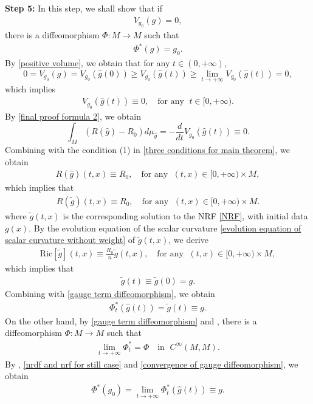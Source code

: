 \documentclass[12pt]{amsart}
\begin{document}
\textbf{Step 5: } In this step, we shall show that if
\begin{align*}
    V_{g_0}(g) = 0,
\end{align*}
there is a diffeomorphism $\Phi: M \rightarrow M$ such that 
\begin{align*}
    \Phi^*(g) = g_0. 
\end{align*}
By \eqref{positive volume}, we obtain that for any $t\in (0, +\infty)$, 
\begin{equation*}
    0 = V_{g_0}(g) = V_{g_0}(\hat{g}(0)) \geq V_{g_0}(\hat{g}(t)) \geq \lim_{t\rightarrow +\infty} V_{g_0}(\hat{g}(t)) = 0,
\end{equation*}
which implies 
\begin{align*}
    V_{g_0}(\hat{g}(t)) \equiv 0,\quad \text{for any }\; t\in [0, +\infty).  
\end{align*}
By \eqref{final proof formula 2}, we obtain  
\begin{equation*}
    \int_{M} (R(\hat{g}) - R_0) d\mu_{\hat{g}} = -\frac{d}{dt}V_{g_0}(\hat{g}(t)) \equiv 0.
\end{equation*}
Combining with the condition (1) in \eqref{three conditions for main theorem}, we obtain 
\begin{align*}
    R(\hat{g})(t, x) \equiv R_0,\quad \text{for any }\; (t, x)\in [0, +\infty) \times M,  
\end{align*}
which implies that 
\begin{align*}
    R(\tilde{g})(t, x) \equiv R_0,\quad \text{for any }\; (t, x)\in [0, +\infty) \times M. 
\end{align*}
where $\tilde{g}(t, x)$ is the corresponding solution to the NRF \eqref{NRF}, with initial data $g(x)$. By the evolution equation of the scalar curvature \eqref{evolution equation of scalar curvature without weight} of $\tilde{g}(t, x)$, we derive 
\begin{align*}
    \mathrm{Ric}[\tilde{g}](t, x) \equiv \frac{R_0}{n}\tilde{g}(t, x),\quad \text{for any }\; (t, x)\in [0, +\infty) \times M, 
\end{align*}
which implies that
\begin{align*}
    \tilde{g}(t)\equiv \tilde{g}(0) = g.
\end{align*}
Combining with \eqref{gauge term diffeomorphism}, we obtain 
\begin{align}\label{nrdf and nrf for still case}
    \Phi_t^*(\hat{g}(t)) = \tilde{g}(t) \equiv g. 
\end{align}
On the other hand, by \eqref{gauge term diffeomorphism} and , there is a diffeomorphism $\Phi : M \rightarrow M$ such that 
\begin{align}\label{convergence of gauge diffeomorphism}
    \lim_{t\rightarrow +\infty}\Phi_t^* =\Phi\quad \text{in }\; C^{\infty}(M, M). 
\end{align}
By , \eqref{nrdf and nrf for still case} and \eqref{convergence of gauge diffeomorphism}, we obtain
\begin{align}
    \Phi^*(g_0) = \lim_{t\rightarrow +\infty}\Phi_t^*(\hat{g}(t)) \equiv g.
\end{align}
\end{document}
